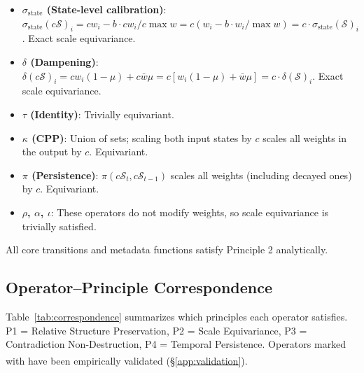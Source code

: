 \documentclass[11pt,a4paper]{article}
\begin{document}
\begin{itemize}
  \item \textbf{$\sigma_{\mathrm{state}}$ (State-level calibration)}: 
    $\sigma_{\mathrm{state}}(c\mathcal{S})_i = c w_i - b \cdot c w_i / c\max w 
    = c(w_i - b \cdot w_i/\max w) = c \cdot \sigma_{\mathrm{state}}(\mathcal{S})_i$. 
    Exact scale equivariance.

  \item \textbf{$\delta$ (Dampening)}: 
    $\delta(c\mathcal{S})_i = c w_i(1-\mu) + c\bar{w}\mu 
    = c[w_i(1-\mu) + \bar{w}\mu] = c \cdot \delta(\mathcal{S})_i$. 
    Exact scale equivariance.

  \item \textbf{$\tau$ (Identity)}: Trivially equivariant.

  \item \textbf{$\kappa$ (CPP)}: Union of sets; scaling both input states 
    by $c$ scales all weights in the output by $c$. Equivariant.

  \item \textbf{$\pi$ (Persistence)}: 
    $\pi(c\mathcal{S}_t, c\mathcal{S}_{t-1})$ scales all 
    weights (including decayed ones) by $c$. Equivariant.

  \item \textbf{$\rho$, $\alpha$, $\iota$}: These operators do not modify 
    weights, so scale equivariance is trivially satisfied.
\end{itemize}

All core transitions and metadata functions satisfy Principle 2 analytically.

\subsection{Operator--Principle Correspondence}
\label{app:correspondence}

Table~\ref{tab:correspondence} summarizes which principles each 
operator satisfies. P1 = Relative Structure Preservation, 
P2 = Scale Equivariance, P3 = Contradiction Non-Destruction, 
P4 = Temporal Persistence. Operators marked with \textsuperscript{\ddag} 
have been empirically validated (§\ref{app:validation}).
\end{document}
